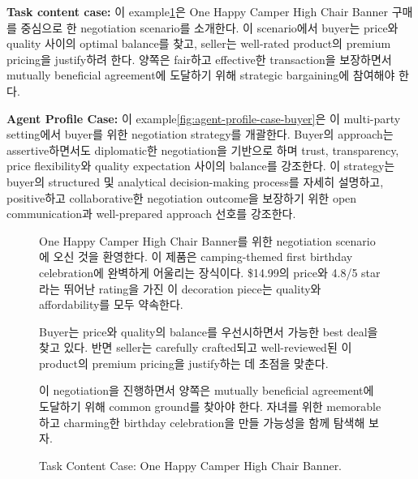 \textbf{Task content case:} 이 example\ref{fig:task-content-banner}은 One Happy Camper High Chair Banner 구매를 중심으로 한 negotiation scenario를 소개한다. 이 scenario에서 buyer는 price와 quality 사이의 optimal balance를 찾고, seller는 well-rated product의 premium pricing을 justify하려 한다. 양쪽은 fair하고 effective한 transaction을 보장하면서 mutually beneficial agreement에 도달하기 위해 strategic bargaining에 참여해야 한다.

\textbf{Agent Profile Case:} 이 example\ref{fig:agent-profile-case-buyer}은 이 multi-party setting에서 buyer를 위한 negotiation strategy를 개괄한다. Buyer의 approach는 assertive하면서도 diplomatic한 negotiation을 기반으로 하며 trust, transparency, price flexibility와 quality expectation 사이의 balance를 강조한다. 이 strategy는 buyer의 structured 및 analytical decision-making process를 자세히 설명하고, positive하고 collaborative한 negotiation outcome을 보장하기 위한 open communication과 well-prepared approach 선호를 강조한다.
\begin{figure}[htbp]
\centering
\begin{tcolorbox}[colback=green!2!white, colframe=gray!50!green]
\begin{minipage}{\linewidth}
\small
One Happy Camper High Chair Banner를 위한 negotiation scenario에 오신 것을 환영한다. 이 제품은 camping-themed first birthday celebration에 완벽하게 어울리는 장식이다. \$14.99의 price와 4.8/5 star라는 뛰어난 rating을 가진 이 decoration piece는 quality와 affordability를 모두 약속한다.

Buyer는 price와 quality의 balance를 우선시하면서 가능한 best deal을 찾고 있다. 반면 seller는 carefully crafted되고 well-reviewed된 이 product의 premium pricing을 justify하는 데 초점을 맞춘다.

이 negotiation을 진행하면서 양쪽은 mutually beneficial agreement에 도달하기 위해 common ground를 찾아야 한다. 자녀를 위한 memorable하고 charming한 birthday celebration을 만들 가능성을 함께 탐색해 보자.

\end{minipage}
\end{tcolorbox}
\caption{Task Content Case: One Happy Camper High Chair Banner.}
\label{fig:task-content-banner}
\end{figure}

